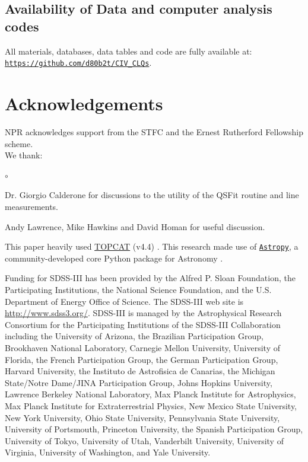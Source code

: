 \documentclass[a4paper,fleqn,usenatbib]{mnras}
\begin{document}
\subsection*{Availability of Data and computer analysis codes} 
All materials, databases, data tables and code are fully available at: 
\href{https://github.com/d80b2t/CIV_CLQs}{\tt https://github.com/d80b2t/CIV\_CLQs}.


\section*{Acknowledgements}
NPR acknowledges support from the STFC and the Ernest Rutherford Fellowship scheme. 
\\

\noindent
We thank:
\begin{list}{$\circ$}{}
  \item  Dr. Giorgio Calderone for discussions to the utility of the QSFit routine and line measurements. 
  \item Andy Lawrence, Mike Hawkins and David Homan for useful discussion.
\end{list}

This paper heavily used \href{http://www.star.bris.ac.uk/~mbt/topcat/}{TOPCAT} (v4.4)
\citep[][]{Taylor2005, Taylor2011}.
This research made use of \href{http://www.astropy.org}{\tt Astropy}, 
a community-developed core Python package for Astronomy 
\citep{AstropyCollaboration2013, AstropyCollaboration2018}.

Funding for SDSS-III has been provided by the Alfred P. Sloan
Foundation, the Participating Institutions, the National Science
Foundation, and the U.S. Department of Energy Office of Science. The
SDSS-III web site is
\href{http://www.sdss3.org/}{http://www.sdss3.org/}.
SDSS-III is managed by the Astrophysical Research Consortium for the
Participating Institutions of the SDSS-III Collaboration including the
University of Arizona, the Brazilian Participation Group, Brookhaven
National Laboratory, Carnegie Mellon University, University of
Florida, the French Participation Group, the German Participation
Group, Harvard University, the Instituto de Astrofisica de Canarias,
the Michigan State/Notre Dame/JINA Participation Group, Johns Hopkins
University, Lawrence Berkeley National Laboratory, Max Planck
Institute for Astrophysics, Max Planck Institute for Extraterrestrial
Physics, New Mexico State University, New York University, Ohio State
University, Pennsylvania State University, University of Portsmouth,
Princeton University, the Spanish Participation Group, University of
Tokyo, University of Utah, Vanderbilt University, University of
Virginia, University of Washington, and Yale University.
\end{document}

